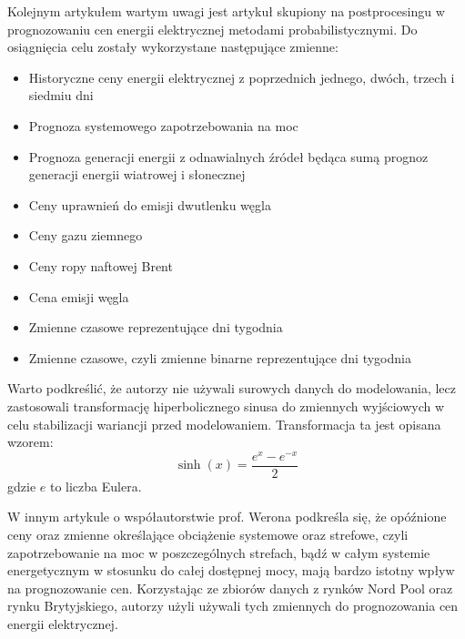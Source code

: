 Kolejnym artykułem wartym uwagi jest artykuł skupiony na postprocesingu \cite{LIPIECKI2024107934} w prognozowaniu cen energii elektrycznej metodami probabilistycznymi. Do osiągnięcia celu zostały wykorzystane następujące zmienne: 
\begin{itemize}
    \item Historyczne ceny energii elektrycznej z poprzednich jednego, dwóch, trzech i siedmiu dni
    \item Prognoza systemowego zapotrzebowania na moc
    \item Prognoza generacji energii z odnawialnych źródeł będąca sumą prognoz generacji energii wiatrowej i słonecznej
    \item Ceny uprawnień do emisji dwutlenku węgla
    \item Ceny gazu ziemnego
    \item Ceny ropy naftowej Brent
    \item Cena emisji węgla
    \item Zmienne czasowe reprezentujące dni tygodnia
    \item Zmienne czasowe, czyli zmienne binarne reprezentujące dni tygodnia
\end{itemize}
Warto podkreślić, że autorzy nie używali surowych danych do modelowania, lecz zastosowali transformację hiperbolicznego sinusa do zmiennych wyjściowych w celu stabilizacji wariancji przed modelowaniem. Transformacja ta jest opisana wzorem:
\[
\sinh(x) = \frac{e^x - e^{-x}}{2}
\]
gdzie \( e \) to liczba Eulera.

W innym artykule o współautorstwie prof. Werona \cite{en9080621} podkreśla się, że opóźnione ceny oraz zmienne określające obciążenie systemowe oraz strefowe, czyli zapotrzebowanie na moc w poszczególnych strefach, bądź w całym systemie energetycznym w stosunku do całej dostępnej mocy, mają bardzo istotny wpływ na prognozowanie cen. Korzystając ze zbiorów danych z rynków Nord Pool oraz rynku Brytyjskiego, autorzy użyli używali tych zmiennych do prognozowania cen energii elektrycznej.

